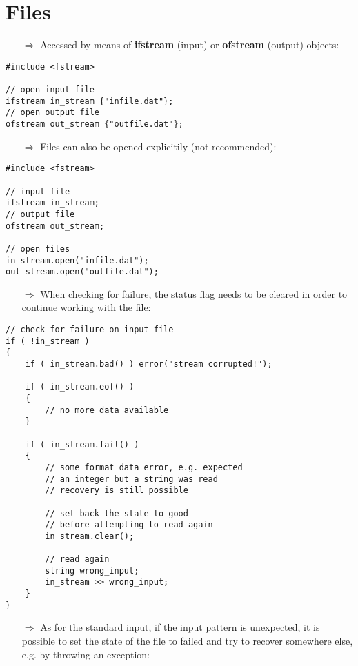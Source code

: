 \documentclass[10pt]{article}
\begin{document}
\section{Files}
\small
\begin{enumerate}
\item[$\Rightarrow$] Accessed by means of \textbf{ifstream} (input) or
\textbf{ofstream} (output) objects:
\end{enumerate}
\begin{lstlisting}
#include <fstream>

// open input file 
ifstream in_stream {"infile.dat"};
// open output file
ofstream out_stream {"outfile.dat"};
\end{lstlisting}
\begin{enumerate}
\item[$\Rightarrow$] Files can also be opened explicitily (not recommended):
\end{enumerate}
\begin{lstlisting}
#include <fstream>

// input file 
ifstream in_stream;
// output file
ofstream out_stream;

// open files
in_stream.open("infile.dat");
out_stream.open("outfile.dat");
\end{lstlisting}
\begin{enumerate}
\item[$\Rightarrow$] When checking for failure, the status flag needs to be cleared
in order to continue working with the file:
\end{enumerate}
\begin{lstlisting}
// check for failure on input file
if ( !in_stream )
{
    if ( in_stream.bad() ) error("stream corrupted!");
    
    if ( in_stream.eof() )
    { 
        // no more data available
    }
    
    if ( in_stream.fail() )
    {
        // some format data error, e.g. expected
        // an integer but a string was read
        // recovery is still possible
        
        // set back the state to good 
        // before attempting to read again
        in_stream.clear();
        
        // read again
        string wrong_input;
        in_stream >> wrong_input;
    }
}
\end{lstlisting}
\begin{enumerate}
\item[$\Rightarrow$] As for the standard input, if the input pattern is unexpected, it is possible to set the state of the file to failed
and try to recover somewhere else, e.g. by throwing an exception:
\end{enumerate}
\end{document}
